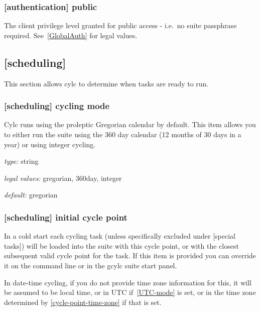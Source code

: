 \subsubsection{[authentication] \textrightarrow public}

The client privilege level granted for public access - i.e.\ no suite passphrase
required.  See~\ref{GlobalAuth} for legal values.

\subsection{[scheduling]}

This section allows cylc to determine when tasks are ready to run.

\subsubsection[cycling]{ [scheduling] \textrightarrow cycling mode }
\label{cycling-mode}

Cylc runs using the proleptic Gregorian calendar by default. This item allows
you to either run the suite using the 360 day calendar (12 months of 30 days 
in a year) or using integer cycling.

\begin{myitemize}
    \item {\em type:} string
    \item {\em legal values:} gregorian, 360day, integer
    \item {\em default:} gregorian
    
\end{myitemize}

\subsubsection[initial cycle point]{[scheduling] \textrightarrow initial cycle point}
\label{initial cycle point}

In a cold start each cycling task (unless specifically excluded under
[special tasks]) will be loaded into the suite with this cycle point,
or with the closest subsequent valid cycle point for the task. If this item is
provided you can override it on the command line or in the gcylc suite start
panel.

In date-time cycling, if you do not provide time zone information for this,
it will be assumed to be local time, or in UTC if~\ref{UTC-mode} is set, or in
the time zone determined by \ref{cycle-point-time-zone} if that is set.

